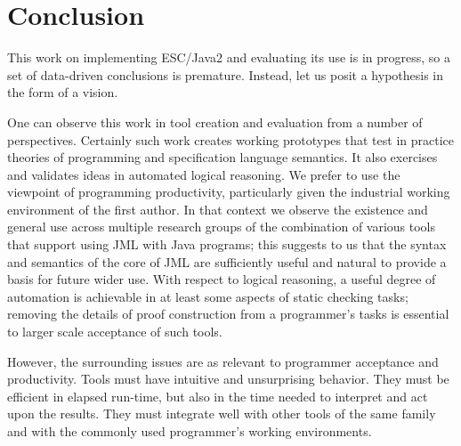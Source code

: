 \documentclass{sig-alternate}
\begin{document}
\section{Conclusion}


This work on implementing ESC/Java2 and evaluating its use is in
progress, so a set of data-driven conclusions is premature.  Instead,
let us posit a hypothesis in the form of a vision.

One can observe this work in tool creation and evaluation from a
number of perspectives.  Certainly such work creates working
prototypes that test in practice theories of programming and
specification language semantics.  It also exercises and validates
ideas in automated logical reasoning.  We prefer to use the viewpoint
of programming productivity, particularly given the industrial working
environment of the first author.  In that context we observe the
existence and general use across multiple research groups of the
combination of various tools that support using JML with Java
programs; this suggests to us that the syntax and semantics of the
core of JML are sufficiently useful and natural to provide a basis for
future wider use.  With respect to logical reasoning, a useful degree
of automation is achievable in at least some aspects of static
checking tasks; removing the details of proof construction from a
programmer's tasks is essential to larger scale acceptance of such
tools.

However, the surrounding issues are as relevant to programmer
acceptance and productivity.  Tools must have intuitive and
unsurprising behavior. They must be efficient in elapsed run-time, but
also in the time needed to interpret and act upon the results.  They
must integrate well with other tools of the same family and with the
commonly used programmer's working environments.

\end{document}
